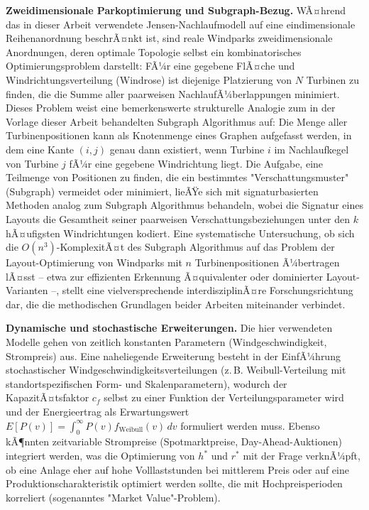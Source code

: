 ﻿\documentclass[a4paper,12pt]{article}
\theoremstyle{definition}
\begin{document}
\textbf{Zweidimensionale Parkoptimierung und Subgraph-Bezug.} WÃ¤hrend das in dieser Arbeit verwendete Jensen-Nachlaufmodell auf eine eindimensionale Reihenanordnung beschrÃ¤nkt ist, sind reale Windparks zweidimensionale Anordnungen, deren optimale Topologie selbst ein kombinatorisches Optimierungsproblem darstellt: FÃ¼r eine gegebene FlÃ¤che und Windrichtungsverteilung (Windrose) ist diejenige Platzierung von $N$ Turbinen zu finden, die die Summe aller paarweisen NachlaufÃ¼berlappungen minimiert. Dieses Problem weist eine bemerkenswerte strukturelle Analogie zum in der Vorlage dieser Arbeit behandelten Subgraph Algorithmus auf: Die Menge aller Turbinenpositionen kann als Knotenmenge eines Graphen aufgefasst werden, in dem eine Kante $(i,j)$ genau dann existiert, wenn Turbine $i$ im Nachlaufkegel von Turbine $j$ fÃ¼r eine gegebene Windrichtung liegt. Die Aufgabe, eine Teilmenge von Positionen zu finden, die ein bestimmtes "Verschattungsmuster" (Subgraph) vermeidet oder minimiert, lieÃŸe sich mit signaturbasierten Methoden analog zum Subgraph Algorithmus behandeln, wobei die Signatur eines Layouts die Gesamtheit seiner paarweisen Verschattungsbeziehungen unter den $k$ hÃ¤ufigsten Windrichtungen kodiert. Eine systematische Untersuchung, ob sich die $O(n^3)$-KomplexitÃ¤t des Subgraph Algorithmus auf das Problem der Layout-Optimierung von Windparks mit $n$ Turbinenpositionen Ã¼bertragen lÃ¤sst -- etwa zur effizienten Erkennung Ã¤quivalenter oder dominierter Layout-Varianten --, stellt eine vielversprechende interdisziplinÃ¤re Forschungsrichtung dar, die die methodischen Grundlagen beider Arbeiten miteinander verbindet.

\textbf{Dynamische und stochastische Erweiterungen.} Die hier verwendeten Modelle gehen von zeitlich konstanten Parametern (Windgeschwindigkeit, Strompreis) aus. Eine naheliegende Erweiterung besteht in der EinfÃ¼hrung stochastischer Windgeschwindigkeitsverteilungen (z.\,B. Weibull-Verteilung mit standortspezifischen Form- und Skalenparametern), wodurch der KapazitÃ¤tsfaktor $c_f$ selbst zu einer Funktion der Verteilungsparameter wird und der Energieertrag als Erwartungswert $E[P(v)] = \int_0^\infty P(v) f_{\mathrm{Weibull}}(v)\,dv$ formuliert werden muss. Ebenso kÃ¶nnten zeitvariable Strompreise (Spotmarktpreise, Day-Ahead-Auktionen) integriert werden, was die Optimierung von $h^*$ und $r^*$ mit der Frage verknÃ¼pft, ob eine Anlage eher auf hohe Volllaststunden bei mittlerem Preis oder auf eine Produktionscharakteristik optimiert werden sollte, die mit Hochpreisperioden korreliert (sogenanntes "Market Value"-Problem).
\end{document}
